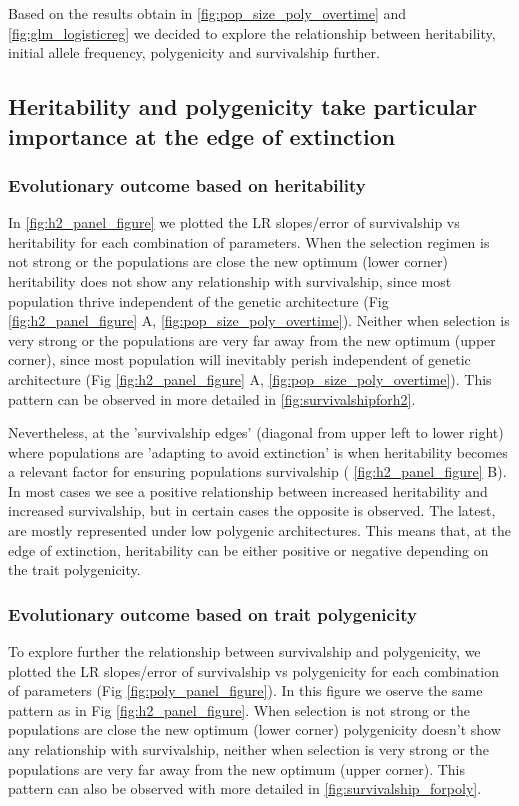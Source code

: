 \documentclass{article}
\begin{document}
Based on the results obtain in \ref{fig:pop_size_poly_overtime} and \ref{fig:glm_logisticreg}  we decided to explore the relationship between heritability, initial allele frequency, polygenicity and survivalship further.

\subsection{Heritability and polygenicity take particular importance at the edge of extinction}
\subsubsection{Evolutionary outcome based on heritability}
In \ref{fig:h2_panel_figure} we plotted the LR slopes/error of survivalship vs heritability for each combination of parameters. When the selection regimen is not strong or the populations are close the new optimum (lower corner) heritability does not show any relationship with survivalship, since most population thrive independent of the genetic architecture (Fig \ref{fig:h2_panel_figure} A, \ref{fig:pop_size_poly_overtime}). Neither when selection is very strong or the populations are very far away from the new optimum (upper corner), since most population will inevitably perish independent of genetic architecture (Fig \ref{fig:h2_panel_figure} A, \ref{fig:pop_size_poly_overtime}). This pattern can be observed in more detailed in \ref{fig:survivalshipforh2}. 

Nevertheless, at the 'survivalship edges' (diagonal from upper left to lower right) where populations are 'adapting to avoid extinction' is when heritability becomes a relevant factor for ensuring populations survivalship ( \ref{fig:h2_panel_figure} B). In most cases we see a positive relationship between increased heritability and increased survivalship, but in certain cases the opposite is observed. The latest, are mostly represented under low polygenic architectures. This means that, at the edge of extinction, heritability can be either positive or negative depending on the trait polygenicity. 
\\
\subsubsection{Evolutionary outcome based on trait polygenicity}
To explore further the relationship between survivalship and polygenicity, we plotted the LR slopes/error of survivalship vs polygenicity for each combination of parameters (Fig \ref{fig:poly_panel_figure}).  In this figure we oserve the same pattern as in Fig \ref{fig:h2_panel_figure}. When selection is not  strong or the populations are close the new optimum (lower corner) polygenicity doesn't show any relationship with survivalship, neither when selection is very strong or the populations are very far away from the new optimum (upper corner). This pattern can also be observed with more detailed in \ref{fig:survivalship_forpoly}. 
\end{document}
